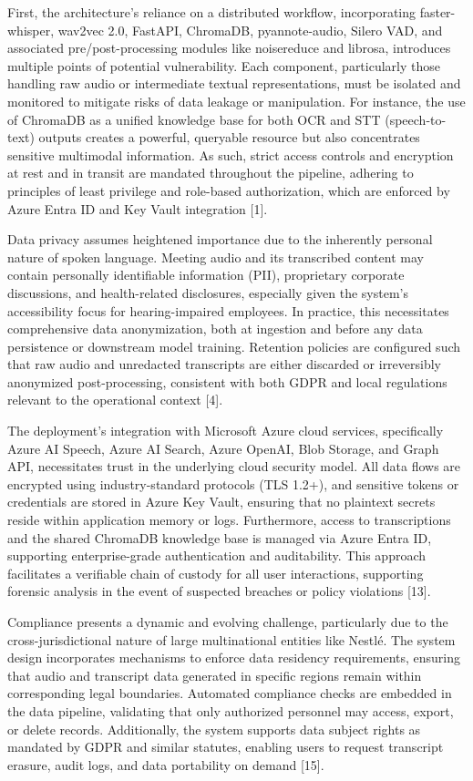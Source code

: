 \documentclass[12pt,a4paper]{article}
\begin{document}
First, the architecture’s reliance on a distributed workflow, incorporating faster-whisper, wav2vec 2.0, FastAPI, ChromaDB, pyannote-audio, Silero VAD, and associated pre/post-processing modules like noisereduce and librosa, introduces multiple points of potential vulnerability. Each component, particularly those handling raw audio or intermediate textual representations, must be isolated and monitored to mitigate risks of data leakage or manipulation. For instance, the use of ChromaDB as a unified knowledge base for both OCR and STT (speech-to-text) outputs creates a powerful, queryable resource but also concentrates sensitive multimodal information. As such, strict access controls and encryption at rest and in transit are mandated throughout the pipeline, adhering to principles of least privilege and role-based authorization, which are enforced by Azure Entra ID and Key Vault integration [1].


Data privacy assumes heightened importance due to the inherently personal nature of spoken language. Meeting audio and its transcribed content may contain personally identifiable information (PII), proprietary corporate discussions, and health-related disclosures, especially given the system’s accessibility focus for hearing-impaired employees. In practice, this necessitates comprehensive data anonymization, both at ingestion and before any data persistence or downstream model training. Retention policies are configured such that raw audio and unredacted transcripts are either discarded or irreversibly anonymized post-processing, consistent with both GDPR and local regulations relevant to the operational context [4].


The deployment’s integration with Microsoft Azure cloud services, specifically Azure AI Speech, Azure AI Search, Azure OpenAI, Blob Storage, and Graph API, necessitates trust in the underlying cloud security model. All data flows are encrypted using industry-standard protocols (TLS 1.2+), and sensitive tokens or credentials are stored in Azure Key Vault, ensuring that no plaintext secrets reside within application memory or logs. Furthermore, access to transcriptions and the shared ChromaDB knowledge base is managed via Azure Entra ID, supporting enterprise-grade authentication and auditability. This approach facilitates a verifiable chain of custody for all user interactions, supporting forensic analysis in the event of suspected breaches or policy violations [13].


Compliance presents a dynamic and evolving challenge, particularly due to the cross-jurisdictional nature of large multinational entities like Nestlé. The system design incorporates mechanisms to enforce data residency requirements, ensuring that audio and transcript data generated in specific regions remain within corresponding legal boundaries. Automated compliance checks are embedded in the data pipeline, validating that only authorized personnel may access, export, or delete records. Additionally, the system supports data subject rights as mandated by GDPR and similar statutes, enabling users to request transcript erasure, audit logs, and data portability on demand [15].
\end{document}
